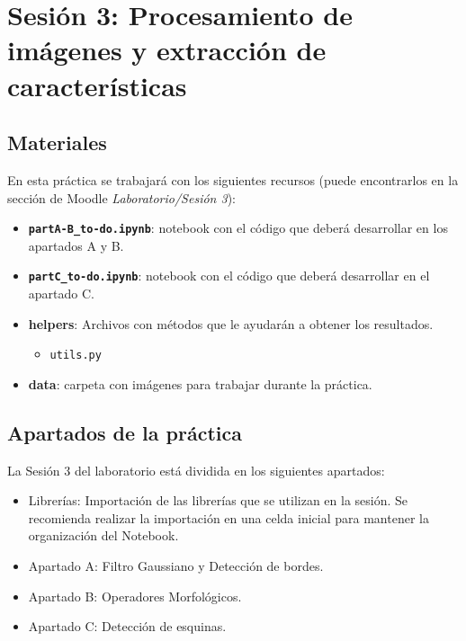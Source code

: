 \chapter{Sesión 3: Procesamiento de imágenes y extracción de características}
\label{chapter:introduction_ses_3}

\section{Materiales}

En esta práctica se trabajará con los siguientes recursos (puede encontrarlos en la sección de Moodle \textit{Laboratorio/Sesión 3}):

\begin{itemize}
    \item \textbf{\texttt{partA-B\_to-do.ipynb}}: notebook con el código que deberá desarrollar en los apartados A y B.
    \item \textbf{\texttt{partC\_to-do.ipynb}}: notebook con el código que deberá desarrollar en el apartado C.
    \item \textbf{helpers}: Archivos con métodos que le ayudarán a obtener los resultados. 
    \begin{itemize}
        \item \texttt{utils.py}
    \end{itemize}
    \item \textbf{data}: carpeta con imágenes para trabajar durante la práctica.
\end{itemize}

\section{Apartados de la práctica}

La Sesión 3 del laboratorio está dividida en los siguientes apartados:

\begin{itemize}
    \item Librerías: Importación de las librerías que se utilizan en la sesión. Se recomienda realizar la importación en una celda inicial para mantener la organización del Notebook.
    \item Apartado A: Filtro Gaussiano y Detección de bordes.
    \item Apartado B: Operadores Morfológicos.
    \item Apartado C: Detección de esquinas.
\end{itemize}

